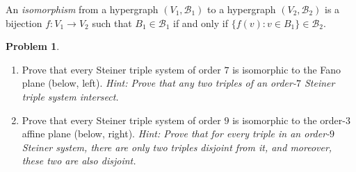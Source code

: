 \documentclass[11pt, letter]{amsart}
\theoremstyle{definition}
\newtheorem{problem}{Problem}[]
\newcommand{\cB}{\ensuremath{\mathcal B}}
\begin{document}
\clearpage
An \textit{isomorphism} from a hypergraph $(V_1, \cB_1)$ to a hypergraph $(V_2, \cB_2)$ is a bijection $f : V_1 \rightarrow V_2$ such that $B_1 \in \cB_1$ if and only if $\{f(v) : v\in B_1\} \in \cB_2$.
\begin{problem}~
  \begin{enumerate}[label=(\alph*)]
  \item Prove that every Steiner triple system of order $7$ is isomorphic to the Fano plane (below, left). \textit{Hint: Prove that any two triples of an order-$7$ Steiner triple system intersect.}

  
  \item Prove that every Steiner triple system of order $9$ is isomorphic to the order-$3$ affine plane (below, right). \textit{Hint: Prove that for every triple in an order-$9$ Steiner system, there are only two triples disjoint from it, and moreover, these two are also disjoint.}


\end{enumerate}
\end{problem}
\end{document}
